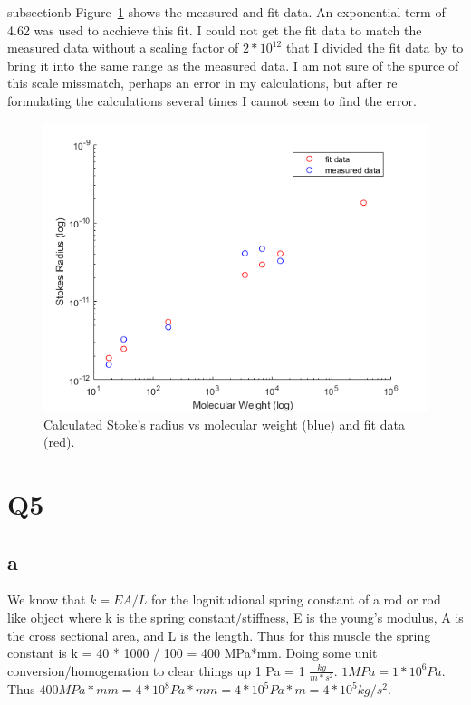 \documentclass[12pt]{article}
\begin{document}
subsection{b}
Figure~\ref{fig:fit} shows the measured and fit data. An exponential term of 4.62 was used to acchieve this fit. I could not get the fit data to match the measured data without a scaling factor of $2*10^{12}$ that I divided the fit data by to bring it into the same range as the measured data. I am not sure of the spurce of this scale missmatch, perhaps an error in my calculations, but after re formulating the calculations several times I cannot seem to  find the error.

\begin{figure}[h]
	
	\centering
		\includegraphics[width=.95\textwidth]{fitData.png}
	
	\caption{Calculated Stoke's radius vs molecular weight (blue) and fit data (red).}
	\label{fig:fit}
\end{figure}

\section{Q5}
\subsection{a}
We know that $k = {EA}/L$ for the lognitudional spring constant of a rod or rod like object where k is the spring constant/stiffness, E is the young's modulus, A is the cross sectional area, and L is the length. Thus for this muscle the spring constant is k = 40 * 1000 / 100 = 400 MPa*mm. Doing some unit conversion/homogenation to clear things up 1 Pa = 1 $\frac{kg}{m*s^2}$. $1 MPa = 1*10^6 Pa$. Thus $400 MPa*mm = 4*10^8Pa*mm = 4*10^5 Pa*m = 4*10^5 kg/s^2$.
\end{document}
